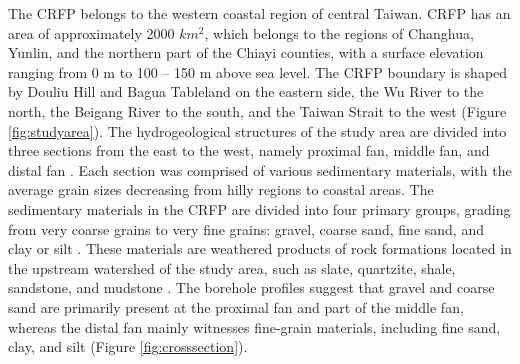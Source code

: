
The CRFP belongs to the western coastal region of central Taiwan. CRFP has an area of approximately 2000 $km^2$, which belongs to the regions of Changhua, Yunlin, and the northern part of the Chiayi counties, with a surface elevation ranging from 0 m to 100 – 150 m above sea level. The CRFP boundary is shaped by Douliu Hill and Bagua Tableland on the eastern side, the Wu River to the north, the Beigang River to the south, and the Taiwan Strait to the west (Figure \ref{fig:studyarea}).
The hydrogeological structures of the study area are divided into three sections from the east to the west, namely proximal fan, middle fan, and distal fan \citep{RN46}. Each section was comprised of various sedimentary materials, with the average grain sizes decreasing from hilly regions to coastal areas. The sedimentary materials in the CRFP are divided into four primary groups, grading from very coarse grains to very fine grains: gravel, coarse sand, fine sand, and clay or silt \citep{RN46}. These materials are weathered products of rock formations located in the upstream watershed of the study area, such as slate, quartzite, shale, sandstone, and mudstone \citep{RN17, RN47}. The borehole profiles suggest that gravel and coarse sand are primarily present at the proximal fan and part of the middle fan, whereas the distal fan mainly witnesses fine-grain materials, including fine sand, clay, and silt (Figure \ref{fig:crosssection}).


